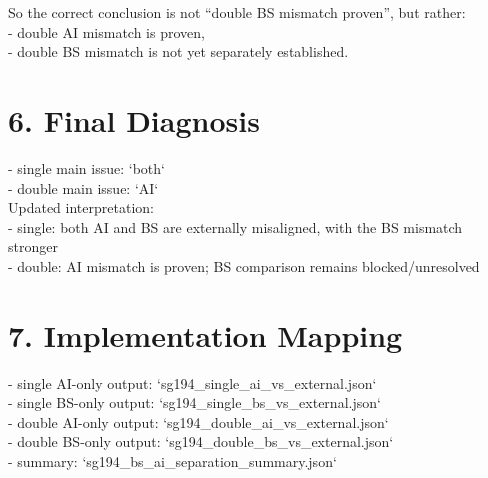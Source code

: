 \documentclass[11pt]{article}
\begin{document}
So the correct conclusion is not “double BS mismatch proven”, but rather:\\
- double AI mismatch is proven,\\
- double BS mismatch is not yet separately established.\\

\section*{6. Final Diagnosis}

- single main issue: `both`\\
- double main issue: `AI`\\

Updated interpretation:\\
- single: both AI and BS are externally misaligned, with the BS mismatch stronger\\
- double: AI mismatch is proven; BS comparison remains blocked/unresolved\\

\section*{7. Implementation Mapping}

- single AI-only output: `sg194\_single\_ai\_vs\_external.json`\\
- single BS-only output: `sg194\_single\_bs\_vs\_external.json`\\
- double AI-only output: `sg194\_double\_ai\_vs\_external.json`\\
- double BS-only output: `sg194\_double\_bs\_vs\_external.json`\\
- summary: `sg194\_bs\_ai\_separation\_summary.json`\\
        
\end{document}
